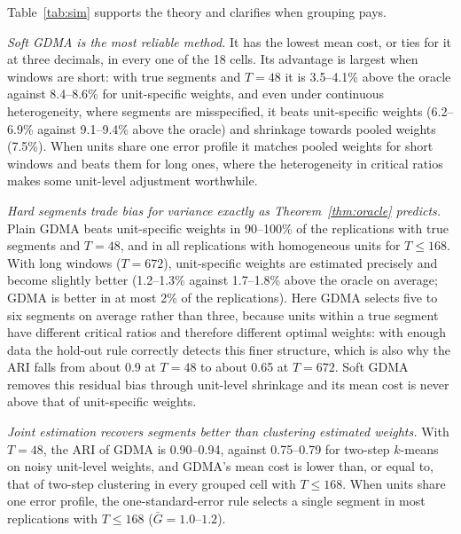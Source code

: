 \begin{table}[t]
\centering
\caption{Monte Carlo results: out-of-sample newsvendor cost relative to the unit-specific oracle (means over 50 replications), average selected number of segments $\bar G$ of GDMA, and adjusted Rand index (ARI; \citealp{HubertArabie1985}) between estimated and true segments for GDMA and two-step clustering. Bold: lowest in the row. Lower is better. The ratio cannot fall below 1; ARI: higher is better.}\label{tab:sim}
\footnotesize
\setlength{\tabcolsep}{2.2pt}

\end{table}

Table~\ref{tab:sim} supports the theory and clarifies when grouping pays.

\emph{Soft GDMA is the most reliable method.}
It has the lowest mean cost, or ties for it at three decimals, in every one of the 18 cells.
Its advantage is largest when windows are short: with true segments and $T=48$ it is 3.5--4.1\% above the oracle against 8.4--8.6\% for unit-specific weights, and even under continuous heterogeneity, where segments are misspecified, it beats unit-specific weights (6.2--6.9\% against 9.1--9.4\% above the oracle) and shrinkage towards pooled weights (7.5\%).
When units share one error profile it matches pooled weights for short windows and beats them for long ones, where the heterogeneity in critical ratios makes some unit-level adjustment worthwhile.

\emph{Hard segments trade bias for variance exactly as Theorem~\ref{thm:oracle} predicts.}
Plain GDMA beats unit-specific weights in 90--100\% of the replications with true segments and $T=48$, and in all replications with homogeneous units for $T\le168$.
With long windows ($T=672$), unit-specific weights are estimated precisely and become slightly better (1.2--1.3\% against 1.7--1.8\% above the oracle on average; GDMA is better in at most 2\% of the replications).
Here GDMA selects five to six segments on average rather than three, because units within a true segment have different critical ratios and therefore different optimal weights: with enough data the hold-out rule correctly detects this finer structure, which is also why the ARI falls from about 0.9 at $T=48$ to about 0.65 at $T=672$.
Soft GDMA removes this residual bias through unit-level shrinkage and its mean cost is never above that of unit-specific weights.

\emph{Joint estimation recovers segments better than clustering estimated weights.}
With $T=48$, the ARI of GDMA is 0.90--0.94, against 0.75--0.79 for two-step $k$-means on noisy unit-level weights, and GDMA's mean cost is lower than, or equal to, that of two-step clustering in every grouped cell with $T\le168$.
When units share one error profile, the one-standard-error rule selects a single segment in most replications with $T\le168$ ($\bar G=1.0$--$1.2$).
